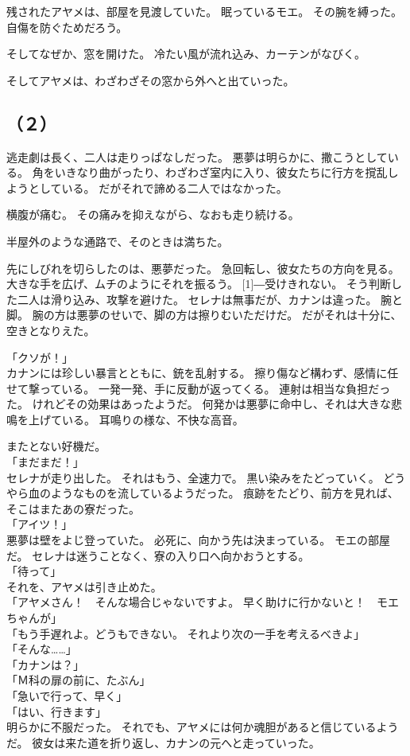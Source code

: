 \documentclass[../IHMain]{subfiles}
\begin{document}
残されたアヤメは、部屋を見渡していた。
眠っているモエ。
その腕を縛った。
自傷を防ぐためだろう。

そしてなぜか、窓を開けた。
冷たい風が流れ込み、カーテンがなびく。

そしてアヤメは、わざわざその窓から外へと出ていった。

\subsection*{（２）}
逃走劇は長く、二人は走りっぱなしだった。
悪夢は明らかに、撒こうとしている。
角をいきなり曲がったり、わざわざ室内に入り、彼女たちに行方を撹乱しようとしている。
だがそれで諦める二人ではなかった。

横腹が痛む。
その痛みを抑えながら、なおも走り続ける。

半屋外のような通路で、そのときは満ちた。

先にしびれを切らしたのは、悪夢だった。
急回転し、彼女たちの方向を見る。
大きな手を広げ、ムチのようにそれを振るう。
\scalebox{3}[1]{―}受けきれない。
そう判断した二人は滑り込み、攻撃を避けた。
セレナは無事だが、カナンは違った。
腕と脚。
腕の方は悪夢のせいで、脚の方は擦りむいただけだ。
だがそれは十分に、空きとなりえた。

「クソが！」\\
カナンには珍しい暴言とともに、銃を乱射する。
擦り傷など構わず、感情に任せて撃っている。
一発一発、手に反動が返ってくる。
連射は相当な負担だった。
けれどその効果はあったようだ。
何発かは悪夢に命中し、それは大きな悲鳴を上げている。
耳鳴りの様な、不快な高音。

またとない好機だ。\\
「まだまだ！」\\
セレナが走り出した。
それはもう、全速力で。
黒い染みをたどっていく。
どうやら血のようなものを流しているようだった。
痕跡をたどり、前方を見れば、そこはまたあの寮だった。\\
「アイツ！」\\
悪夢は壁をよじ登っていた。
必死に、向かう先は決まっている。
モエの部屋だ。
セレナは迷うことなく、寮の入り口へ向かおうとする。\\
「待って」\\
それを、アヤメは引き止めた。\\
「アヤメさん！　そんな場合じゃないですよ。
早く助けに行かないと！　モエちゃんが」\\
「もう手遅れよ。どうもできない。
それより次の一手を考えるべきよ」\\
「そんな……」\\
「カナンは？」\\
「Ｍ科の扉の前に、たぶん」\\
「急いで行って、早く」\\
「はい、行きます」\\
明らかに不服だった。
それでも、アヤメには何か魂胆があると信じているようだ。
彼女は来た道を折り返し、カナンの元へと走っていった。
\end{document}
